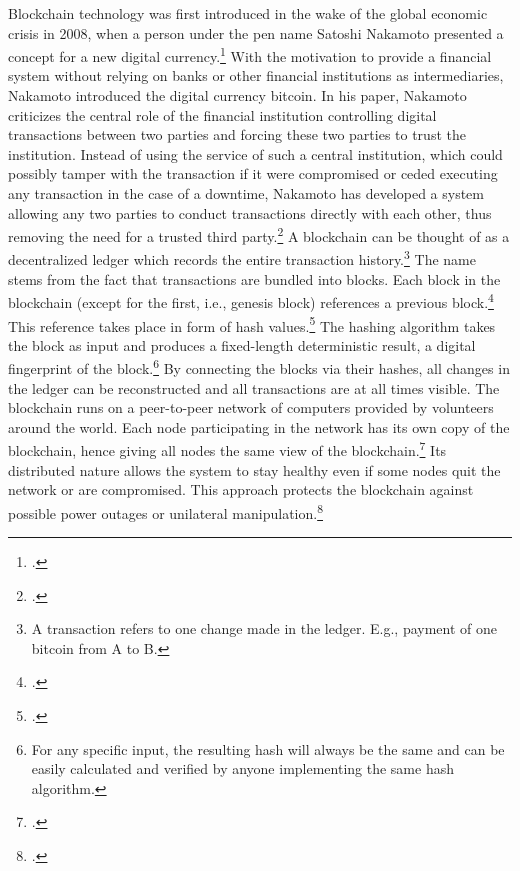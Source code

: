Blockchain technology was first introduced in the wake of the global economic crisis in 2008, when a person under the pen name Satoshi Nakamoto presented a concept for a new digital currency.\footcite[Cf.][]{Nakamoto.2008} With the motivation to provide a financial system without relying on banks or other financial institutions as intermediaries, Nakamoto introduced the digital currency bitcoin. In his paper, Nakamoto criticizes the central role of the financial institution controlling digital transactions between two parties and forcing these two parties to trust the institution. Instead of using the service of such a central institution, which could possibly tamper with the transaction if it were compromised or ceded executing any transaction in the case of a downtime, Nakamoto has developed a system allowing any two parties to conduct transactions directly with each other, thus removing the need for a trusted third party.\footcite[Cf.][p.2]{Nakamoto.2008} A blockchain can be thought of as a decentralized ledger which records the entire transaction history.\footnote{A transaction refers to one change made in the ledger. E.g., payment of one bitcoin from A to B.} The name stems from the fact that transactions are bundled into blocks. Each block in the blockchain (except for the first, i.e., genesis block) references a previous block.\footcite[Cf.][chapter 1]{BashirMasteringBlockchain2017} This reference takes place in form of hash values.\footcite[Cf.][p.351]{AntonopolousAndreasM..2017} The hashing algorithm takes the block as input and produces a fixed-length deterministic result, a digital fingerprint of the block.\footnote{For any specific input, the resulting hash will always be the same and can be easily calculated and verified by anyone implementing the same hash algorithm.} By connecting the blocks via their hashes, all changes in the ledger can be reconstructed and all transactions are at all times visible. The blockchain runs on a peer-to-peer network of computers provided by volunteers around the world. Each node participating in the network has its own copy of the blockchain, hence giving all nodes the same view of the blockchain.\footcites[Cf.][p.5]{Tapscott.2017}[cf.][p.41]{Welzel.2017} Its distributed nature allows the system to stay healthy even if some nodes quit the network or are compromised. This approach protects the blockchain against possible power outages or unilateral manipulation.\footcite[Cf.][p.8]{Nakamoto.2008}

